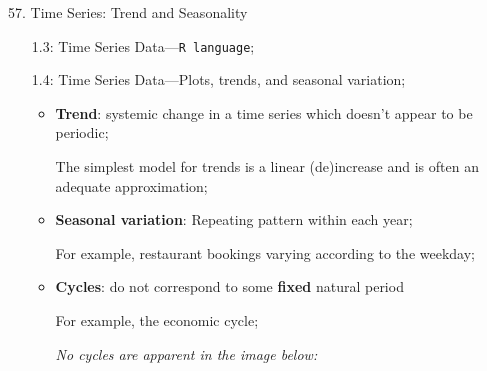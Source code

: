 \begin{CHPT_SUMM_AUTO}[label = {L.-57}]{57. Time Series: Trend and Seasonality}
\begin{itemize}
\begin{itemize}
\begin{itemize}
			\item	The data could have been aggregated over the period (for example, the number of foreign tourists arriving per day);
			\item	The data could have been sampled over the period (for example, the daily close price of Apple stock).
			\end{itemize}
		\end{itemize}
	\item[1.3:]	Time Series Data---\texttt{R language};
	\item[1.4:]	Time Series Data---Plots, trends, and seasonal variation;
		\begin{itemize}
		\item	\textbf{Trend}: systemic change in a time series which doesn't appear to be periodic;
		\item[]	The simplest model for trends is a linear (de)increase and is often an adequate approximation;
		\item	\textbf{Seasonal variation}: Repeating pattern within each year;
		\item[]	For example, restaurant bookings varying according to the weekday;
		\item	\textbf{Cycles}: do not correspond to some \textbf{fixed} natural period
		\item[]	For example, the economic cycle;
		\item[]	\textit{No cycles are apparent in the image below:}
		

\end{itemize}
\end{itemize}
\end{CHPT_SUMM_AUTO}
